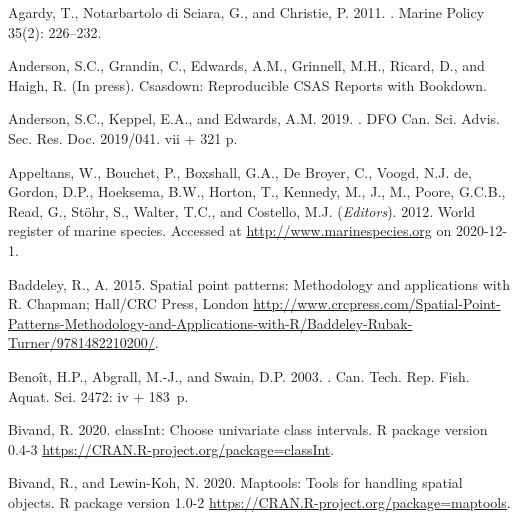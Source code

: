 \documentclass[12pt]{article}\usepackage[]{graphicx}\usepackage[]{color}
\begin{document}
\hypertarget{refs}{}
\begin{CSLReferences}{1}{0}
\leavevmode\hypertarget{ref-Agardy:2011}{}%
Agardy, T., Notarbartolo di Sciara, G., and Christie, P. 2011. . Marine Policy 35(2): 226--232.

\leavevmode\hypertarget{ref-R:csasdown}{}%
Anderson, S.C., Grandin, C., Edwards, A.M., Grinnell, M.H., Ricard, D., and Haigh, R. (In press). Csasdown: {R}eproducible {CSAS} {R}eports with {B}ookdown.

\leavevmode\hypertarget{ref-Anderson:2019}{}%
Anderson, S.C., Keppel, E.A., and Edwards, A.M. 2019. . DFO Can. Sci. Advis. Sec. Res. Doc. 2019/041. vii + 321 p.

\leavevmode\hypertarget{ref-WoRMS}{}%
Appeltans, W., Bouchet, P., Boxshall, G.A., De Broyer, C., Voogd, N.J. de, Gordon, D.P., Hoeksema, B.W., Horton, T., Kennedy, M., J., M., Poore, G.C.B., Read, G., Stöhr, S., Walter, T.C., and Costello, M.J. (\emph{Editors}). 2012. World register of marine species. Accessed at \url{http://www.marinespecies.org} on 2020-12-1.

\leavevmode\hypertarget{ref-R:package:spatstat}{}%
Baddeley, R., A. 2015. Spatial point patterns: Methodology and applications with {R}. Chapman; Hall/CRC Press, London \url{http://www.crcpress.com/Spatial-Point-Patterns-Methodology-and-Applications-with-R/Baddeley-Rubak-Turner/9781482210200/}.

\leavevmode\hypertarget{ref-Benoit:etal:2003:techreport}{}%
Benoît, H.P., Abgrall, M.-J., and Swain, D.P. 2003. . Can. Tech. Rep. Fish. Aquat. Sci. 2472: iv + 183~p.

\leavevmode\hypertarget{ref-R:package:classInt}{}%
Bivand, R. 2020. classInt: Choose univariate class intervals. R package version 0.4-3 \url{https://CRAN.R-project.org/package=classInt}.

\leavevmode\hypertarget{ref-R:package:maptools}{}%
Bivand, R., and Lewin-Koh, N. 2020. Maptools: Tools for handling spatial objects. R package version 1.0-2 \url{https://CRAN.R-project.org/package=maptools}.


\end{CSLReferences}
\end{document}
